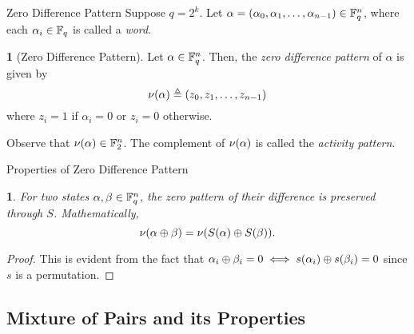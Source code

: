 \documentclass[notheorems]{beamer}
\newtheorem{lemma}{\translate{Lemma}}
\theoremstyle{definition}
\newtheorem{definition}{\translate{Definition}}
\theoremstyle{example}
\begin{document}
    \begin{frame}{Zero Difference Pattern}
        Suppose \(q = 2^k\). Let \(\alpha = (\alpha_0, \alpha_1, \ldots,
        \alpha_{n - 1}) \in \mathbb F_q^n\), where each \(\alpha_i \in \mathbb F_q\) is
        called a \emph{word}.
        \pause
        \begin{definition}[Zero Difference Pattern]
            \label{def:zero-diff}
            Let \(\alpha \in \mathbb F_q^n\). Then, the \emph{zero difference pattern}
            of \(\alpha\) is given by
            \begin{equation}
                \nu(\alpha) \triangleq (z_0, z_1, \ldots, z_{n - 1})
                \label{eq:zero-diff}
            \end{equation}
            where \(z_i = 1\) if \(\alpha_i = 0\) or \(z_i = 0\) otherwise.
        \end{definition}
        \pause
        Observe that \(\nu(\alpha) \in \mathbb F_2^n\). The complement of
        \(\nu(\alpha)\) is called the \emph{activity pattern}.
    \end{frame}

    \begin{frame}{Properties of Zero Difference Pattern}
        \begin{lemma}
            \label{lem:zero-diff-perm}
            For two states \(\alpha, \beta \in \mathbb F_q^n\), the zero pattern of
            their difference is preserved through \(S\). Mathematically,
            \begin{equation}
                \nu(\alpha \oplus \beta) = \nu(S(\alpha) \oplus S(\beta)).
                \label{eq:zero-diff-perm}
            \end{equation}
        \end{lemma}
        \pause
        \begin{proof}
            This is evident from the fact that \(\alpha_i \oplus \beta_i = 0
            \iff s(\alpha_i) \oplus s(\beta_i) = 0\) since \(s\) is a
            permutation.
        \end{proof}
    \end{frame}

    \subsection{Mixture of Pairs and its Properties}
\end{document}
